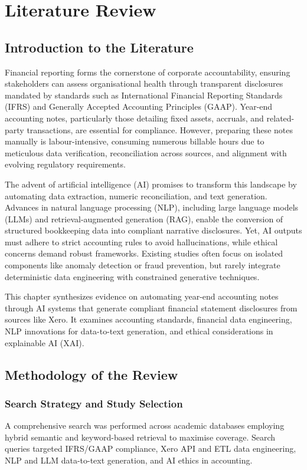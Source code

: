 \chapter{Literature Review}
\label{chap:literature_review}

\section{Introduction to the Literature}
Financial reporting forms the cornerstone of corporate accountability, ensuring stakeholders can assess organisational health through transparent disclosures mandated by standards such as International Financial Reporting Standards (IFRS) and Generally Accepted Accounting Principles (GAAP). Year-end accounting notes, particularly those detailing fixed assets, accruals, and related-party transactions, are essential for compliance. However, preparing these notes manually is labour-intensive, consuming numerous billable hours due to meticulous data verification, reconciliation across sources, and alignment with evolving regulatory requirements. 

The advent of artificial intelligence (AI) promises to transform this landscape by automating data extraction, numeric reconciliation, and text generation. Advances in natural language processing (NLP), including large language models (LLMs) and retrieval-augmented generation (RAG), enable the conversion of structured bookkeeping data into compliant narrative disclosures. Yet, AI outputs must adhere to strict accounting rules to avoid hallucinations, while ethical concerns demand robust frameworks. Existing studies often focus on isolated components like anomaly detection or fraud prevention, but rarely integrate deterministic data engineering with constrained generative techniques.

This chapter synthesizes evidence on automating year-end accounting notes through AI systems that generate compliant financial statement disclosures from sources like Xero. It examines accounting standards, financial data engineering, NLP innovations for data-to-text generation, and ethical considerations in explainable AI (XAI).

\section{Methodology of the Review}
\subsection{Search Strategy and Study Selection}
A comprehensive search was performed across academic databases employing hybrid semantic and keyword-based retrieval to maximise coverage. Search queries targeted IFRS/GAAP compliance, Xero API and ETL data engineering, NLP and LLM data-to-text generation, and AI ethics in accounting.

